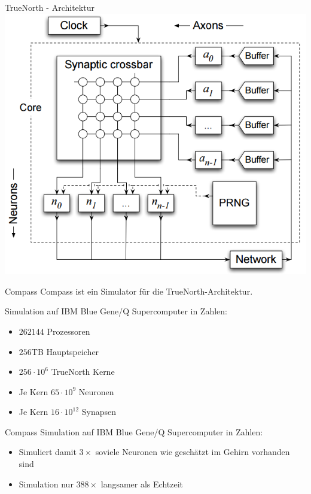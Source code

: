 \begin{slide}{TrueNorth - Architektur}
	\includegraphics[width=\textwidth,height=0.8\textheight,keepaspectratio]{content/TrueNorthArchitecture.PNG}
\end{slide}

\begin{slide}{Compass}
	Compass ist ein Simulator für die TrueNorth-Architektur.
	
	Simulation auf IBM Blue Gene/Q Supercomputer in Zahlen:
	\begin{itemize}
		\item $262144$ Prozessoren
		\item $256$TB Hauptspeicher
		\item $256 \cdot 10^6$ TrueNorth Kerne
		\item Je Kern $65 \cdot 10^9$ Neuronen
		\item Je Kern $16 \cdot 10^12$ Synapsen
	\end{itemize}
\end{slide}

\begin{slide}{Compass}	
	Simulation auf IBM Blue Gene/Q Supercomputer in Zahlen:
	\begin{itemize}
		\item Simuliert damit $3\times$ soviele Neuronen wie geschätzt im Gehirn vorhanden sind
		\item Simulation nur $388\times$ langsamer als Echtzeit
	\end{itemize}
\end{slide}

